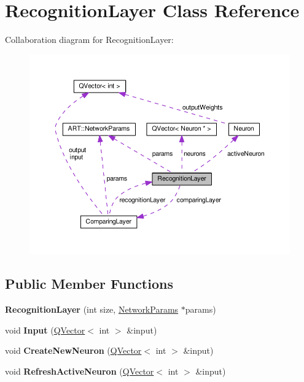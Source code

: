 \hypertarget{class_recognition_layer}{}\section{Recognition\+Layer Class Reference}
\label{class_recognition_layer}


Collaboration diagram for Recognition\+Layer\+:\nopagebreak
\begin{figure}[H]
\begin{center}
\leavevmode
\includegraphics[width=350pt]{class_recognition_layer__coll__graph}
\end{center}
\end{figure}
\subsection*{Public Member Functions}
\begin{DoxyCompactItemize}
\item 
{\bfseries Recognition\+Layer} (int size, \hyperlink{struct_a_r_t_1_1_network_params}{Network\+Params} $\ast$params)\hypertarget{class_recognition_layer_aeac3da57473f65476beb397fb6230d67}{}\label{class_recognition_layer_aeac3da57473f65476beb397fb6230d67}

\item 
void {\bfseries Input} (\hyperlink{class_q_vector}{Q\+Vector}$<$ int $>$ \&input)\hypertarget{class_recognition_layer_a0a13b30e2eace25d061274ef149fc944}{}\label{class_recognition_layer_a0a13b30e2eace25d061274ef149fc944}

\item 
void {\bfseries Create\+New\+Neuron} (\hyperlink{class_q_vector}{Q\+Vector}$<$ int $>$ \&input)\hypertarget{class_recognition_layer_a775e058d1b7f2a6d2bcdae95f7d3c567}{}\label{class_recognition_layer_a775e058d1b7f2a6d2bcdae95f7d3c567}

\item 
void {\bfseries Refresh\+Active\+Neuron} (\hyperlink{class_q_vector}{Q\+Vector}$<$ int $>$ \&input)\hypertarget{class_recognition_layer_add15a8f3237d548fd4235843dea48efd}{}\label{class_recognition_layer_add15a8f3237d548fd4235843dea48efd}

\end{DoxyCompactItemize}
